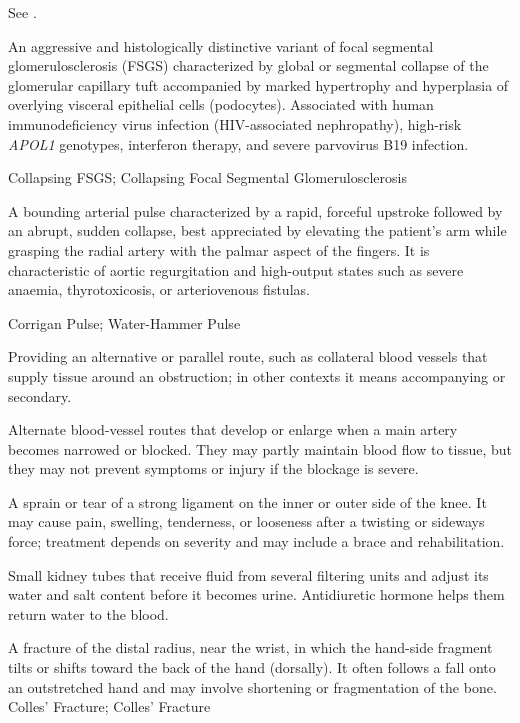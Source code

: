  See .

 An aggressive and histologically distinctive variant of focal segmental glomerulosclerosis (FSGS) characterized by global or segmental collapse of the glomerular capillary tuft accompanied by marked hypertrophy and hyperplasia of overlying visceral epithelial cells (podocytes). Associated with human immunodeficiency virus infection (HIV-associated nephropathy), high-risk \textit{APOL1} genotypes, interferon therapy, and severe parvovirus B19 infection.

\synonyms
Collapsing FSGS; Collapsing Focal Segmental Glomerulosclerosis

 A bounding arterial pulse characterized by a rapid, forceful upstroke followed by an abrupt, sudden collapse, best appreciated by elevating the patient's arm while grasping the radial artery with the palmar aspect of the fingers. It is characteristic of aortic regurgitation and high-output states such as severe anaemia, thyrotoxicosis, or arteriovenous fistulas.

\synonyms
Corrigan Pulse; Water-Hammer Pulse

 Providing an alternative or parallel route, such as collateral blood vessels that supply tissue around an obstruction; in other contexts it means accompanying or secondary.

 Alternate blood-vessel routes that develop or enlarge when a main artery becomes narrowed or blocked. They may partly maintain blood flow to tissue, but they may not prevent symptoms or injury if the blockage is severe.

 A sprain or tear of a strong ligament on the inner or outer side of the knee. It may cause pain, swelling, tenderness, or looseness after a twisting or sideways force; treatment depends on severity and may include a brace and rehabilitation.

 Small kidney tubes that receive fluid from several filtering units and adjust its water and salt content before it becomes urine. Antidiuretic hormone helps them return water to the blood.

 A fracture of the distal radius, near the wrist, in which the hand-side fragment tilts or shifts toward the back of the hand (dorsally). It often follows a fall onto an outstretched hand and may involve shortening or fragmentation of the bone.
\synonyms
Colles' Fracture; Colles’ Fracture

